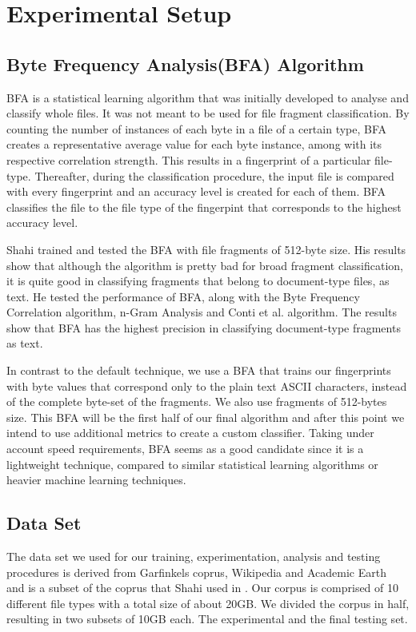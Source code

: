 \chapter{Experimental Setup}

\section{Byte Frequency Analysis(BFA) Algorithm}
BFA\cite{MacDaniel} is a statistical learning algorithm that was initially developed to analyse and classify whole files. It was not meant to be used for file fragment classification. By counting the number of instances of each byte in a file of a certain type, BFA creates a representative average value for each byte instance, among with its respective correlation strength. This results in a fingerprint of a particular file-type. Thereafter, during the classification procedure, the input file is compared with every fingerprint and an accuracy level is created for each of them. BFA classifies the file to the file type of the fingerpint that corresponds to the highest accuracy level.

Shahi\cite{Ashim} trained and tested the BFA with file fragments of 512-byte size. His results show that although the algorithm is pretty bad for broad fragment classification, it is quite good in classifying fragments that belong to document-type files, as text. He tested the performance of BFA, along with the Byte Frequency Correlation algorithm, n-Gram Analysis and Conti et al. algorithm. The results show that BFA has the highest precision in classifying document-type fragments as text.

In contrast to the default technique, we use a BFA that trains our fingerprints with byte values that correspond only to the plain text ASCII characters, instead of the complete byte-set of the fragments. We also use fragments of 512-bytes size. This BFA will be the first half of our final algorithm and after this point we intend to use additional metrics to create a custom classifier. Taking under account speed requirements, BFA seems as a good candidate since it is a lightweight technique, compared to similar statistical learning algorithms\cite{Ashim} or heavier machine learning techniques. 

\section{Data Set}
The data set we used for our training, experimentation, analysis and testing procedures is derived from  Garfinkels\cite{Garfinkel}\cite{Corpora} coprus, Wikipedia and Academic Earth~\cite{A.Earth} and is a subset of the coprus that Shahi used in \cite{Ashim}. Our corpus is comprised of 10 different file types with a total size of about 20GB. We divided the corpus in half, resulting in two subsets of 10GB each. The experimental and the final testing set.

